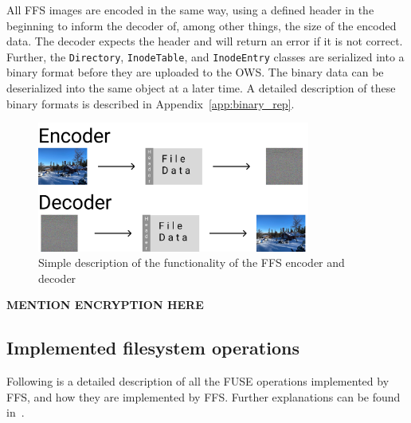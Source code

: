 All FFS images are encoded in the same way, using a defined header in the beginning to inform the decoder of, among other things, the size of the encoded data. The decoder expects the header and will return an error if it is not correct. Further, the \texttt{Directory}, \texttt{InodeTable}, and \texttt{InodeEntry} classes are serialized into a binary format before they are uploaded to the OWS. The binary data can be deserialized into the same object at a later time. A detailed description of these binary formats is described in Appendix~\ref{app:binary_rep}.

\begin{figure}[!ht]
	\begin{center}
	  \includegraphics[width=0.8\textwidth]{figures/encoder_decoder.png}
	\end{center}
	\caption{Simple description of the functionality of the FFS encoder and decoder}
	\label{fig:file_enc_dec}
\end{figure}

\textbf{MENTION ENCRYPTION HERE}

\subsection{Implemented filesystem operations}
\label{subsec:file_op}
Following is a detailed description of all the FUSE operations implemented by FFS, and how they are implemented by FFS. Further explanations can be found in \,\cite{kuenningCS135FUSEDocumentation2010}. 

